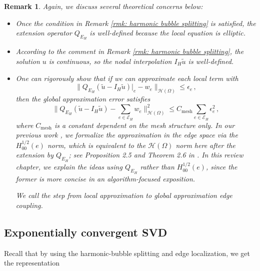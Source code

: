 \documentclass[12pt]{caltech_thesis}
\newtheorem{remark}[theorem]{Remark}
\numberwithin{equation}{section}
\begin{document}
\begin{remark}
\label{rmk: theory for edge localization}
    Again, we discuss several theoretical concerns below:
    \begin{itemize}
        \item Once the condition in Remark \ref{rmk: harmonic bubble splitting} is satisfied, the extension operator $Q_{E_H}$ is well-defined because the local equation is elliptic.
        \item According to the comment in Remark \ref{rmk: harmonic bubble splitting}, the solution $u$ is continuous, so the nodal interpolation $I_H \tilde{u}$ is well-defined.
        \item One can rigorously show that if we can approximate each local term with \[\|Q_{E_H}(\tilde{u}-I_H\tilde{u})|_{e} - w_e\|_{\mathcal{H}(\Omega)} \leq \epsilon_e \, ,\]
        then the global approximation error satisfies
        \[\|Q_{E_H}(\tilde{u}-I_H\tilde{u}) - \sum_{e \in \mathcal{E}_H} w_e\|_{\mathcal{H}(\Omega)}^2 \leq C_{\mathrm{mesh}}\sum_{e \in \mathcal{E}_H}\epsilon_e^2\, , \]
        where $C_{\mathrm{mesh}}$ is a constant dependent on the mesh structure only. In our previous work \cite{chen2021exponential,chen2023exponentially}, we formalize the approximation in the edge space via the $H_{00}^{1/2}(e)$ norm, which is equivalent to the $\mathcal{H}(\Omega)$ norm here after the extension by $Q_{E_H}$; see Proposition 2.5 and Theorem 2.6 in \cite{chen2021exponential}. In this review chapter, we explain the ideas using $Q_{E_H}$ rather than $H_{00}^{1/2}(e)$, since the former is more concise in an algorithm-focused exposition.
        
        We call the step from local approximation to global approximation \textit{edge coupling}.
    \end{itemize}
\end{remark}
\subsection{Exponentially convergent SVD}
\label{sec: Exponentially convergent SVD}
Recall that by using the harmonic-bubble splitting and edge localization, we get the representation
\end{document}
